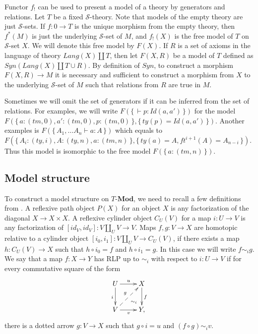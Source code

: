 \documentclass[reqno]{amsart}
\theoremstyle{definition}
\theoremstyle{remark}
\newcommand{\cat}[1]{\mathbf{#1}}
\newcommand{\Mod}[1]{#1\text{-}\cat{Mod}}
\newcommand{\cyli}{i}
\numberwithin{figure}{section}
\begin{document}
Functor $f_!$ can be used to present a model of a theory by generators and relations.
Let $T$ be a fixed $\mathcal{S}$-theory.
Note that models of the empty theory are just $\mathcal{S}$-sets.
If $f : 0 \to T$ is the unique morphism from the empty theory, then $f^*(M)$ is just the underlying $\mathcal{S}$-set of $M$,
    and $f_!(X)$ is the free model of $T$ on $\mathcal{S}$-set $X$.
We will denote this free model by $F(X)$.
If $R$ is a set of axioms in the language of theory $Lang(X) \amalg T$,
    then let $F(X,R)$ be a model of $T$ defined as $Syn(Lang(X) \amalg T \cup R)$.
By definition of $Syn$, to construct a morphism $F(X,R) \to M$ it is necessary and sufficient
    to construct a morphism from $X$ to the underlying $\mathcal{S}$-set of $M$ such that relations from $R$ are true in $M$.

Sometimes we will omit the set of generators if it can be inferred from the set of relations.
For examples, we will write $F(\{\,\vdash p : Id(a,a')\,\})$ for the model $F(\{\,a : (tm,0), a' : (tm,0), p : (tm,0)\,\}, \{\,ty(p) = Id(a,a')\,\})$.
Another examples is $F(\{\,A_1, \ldots A_n \vdash a : A\,\})$ which equals to $F(\{\,A_i : (ty,i), A : (ty,n), a : (tm,n)\,\}, \{\,ty(a) = A, ft^{i+1}(A) = A_{n-i}\,\})$.
Thus this model is isomorphic to the free model $F(\{\,a : (tm,n)\,\})$.

\subsection{Model structure}

To construct a model structure on $\Mod{T}$, we need to recall a few definitions from \cite{f-model-structures}.
A reflexive path object $P(X)$ for an object $X$ is any factorization of the diagonal $X \to X \times X$.
A reflexive cylinder object $C_U(V)$ for a map $i : U \to V$ is any factorization of $[id_V,id_V] : V \amalg_U V \to V$.
Maps $f,g : V \to X$ are homotopic relative to a cylinder object $[\cyli_0,\cyli_1] : V \amalg_U V \to C_U(V)$, if there exists a map $h : C_U(V) \to X$
such that $h \circ \cyli_0 = f$ and $h \circ \cyli_1 = g$.
In this case we will write $f \sim_i g$.
We say that a map $f : X \to Y$ has RLP up to $\sim_i$ with respect to $i : U \to V$ if for every commutative square of the form
\[ \xymatrix{ U \ar[r]^u \ar@{}[dr]|(.7){\sim_i} \ar[d]_i & X \ar[d]^f \\
              V \ar[r]_v \ar@{-->}[ur]^g                  & Y,
            } \]
there is a dotted arrow $g : V \to X$ such that $g \circ i = u$ and $(f \circ g) \sim_i v$.
\end{document}
